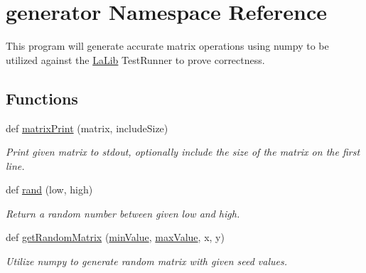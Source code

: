 \hypertarget{namespacegenerator}{}\section{generator Namespace Reference}
\label{namespacegenerator}


This program will generate accurate matrix operations using numpy to be utilized against the \mbox{\hyperlink{namespaceLaLib}{La\+Lib}} Test\+Runner to prove correctness.  


\subsection*{Functions}
\begin{DoxyCompactItemize}
\item 
\mbox{\label{namespacegenerator_a7fecf4fa19a7717368e1756df8eadb4c}} 
def \mbox{\hyperlink{namespacegenerator_a7fecf4fa19a7717368e1756df8eadb4c}{matrix\+Print}} (matrix, include\+Size)
\begin{DoxyCompactList}\small\item\em Print given matrix to stdout, optionally include the size of the matrix on the first line. \end{DoxyCompactList}\item 
\mbox{\label{namespacegenerator_a84a4ed82e74540b0e085290607516a46}} 
def \mbox{\hyperlink{namespacegenerator_a84a4ed82e74540b0e085290607516a46}{rand}} (low, high)
\begin{DoxyCompactList}\small\item\em Return a random number between given low and high. \end{DoxyCompactList}\item 
\mbox{\label{namespacegenerator_a20c4e9b4b7e43b6c9f378d31d011467e}} 
def \mbox{\hyperlink{namespacegenerator_a20c4e9b4b7e43b6c9f378d31d011467e}{get\+Random\+Matrix}} (\mbox{\hyperlink{namespacegenerator_a1aed69a5264581b10544330d2060af2c}{min\+Value}}, \mbox{\hyperlink{namespacegenerator_a38b196f0609e1295c246d9bb79073259}{max\+Value}}, x, y)
\begin{DoxyCompactList}\small\item\em Utilize numpy to generate random matrix with given seed values. \end{DoxyCompactList}\item 

\end{DoxyCompactItemize}
